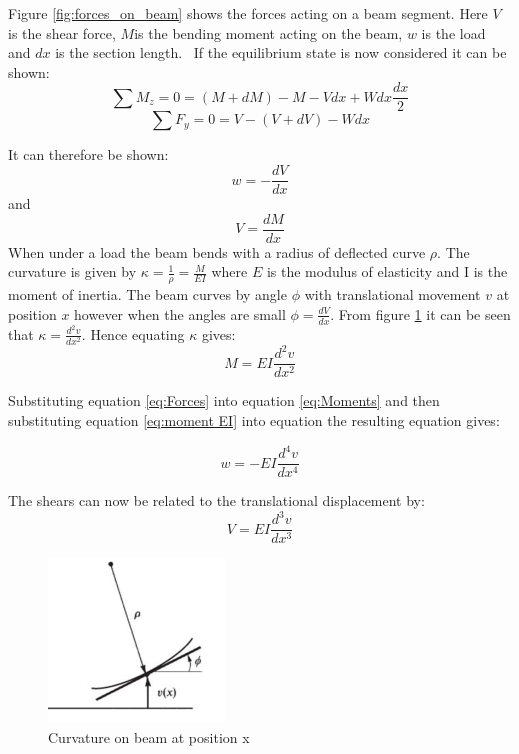 \documentclass[]{report}
\begin{document}
 Figure \ref{fig:forces_on_beam} shows the forces acting on a beam segment. Here $V$ is the shear force, $M$is the bending moment acting on the beam, $w$ is the load and $dx$ is the section length. 
\
If the equilibrium state is now considered it can be shown:
\begin{equation}
	\sum M_z = 0 = (M+dM) - M - Vdx + W dx \frac{dx}{2}
	\label{eq:equilibrium of moments}
\end{equation}
\begin{equation}
\sum F_y = 0 = V - (V+dV) - W dx
\label{eq:equilibrium of forces}
\end{equation}

It can therefore be shown:
\begin{equation}
w = -\frac{dV}{dx}
\label{eq:Moments}
\end{equation}
and 
\begin{equation}
V = \frac{dM}{dx}
\label{eq:Forces}
\end{equation}
When under a load the beam bends with a radius of deflected curve $\rho$. The curvature is given by $\kappa = \frac{1}{\rho} = \frac{M}{EI}$ where $E$ is the modulus of elasticity and I is the moment of inertia. The beam curves by angle $\phi$ with translational movement $v$ at position $x$ however when the angles are small $\phi = \frac{dV}{dx}$. From figure \ref{fig:curvature} it can be seen that $\kappa = \frac{d^2 v}{d x^2}$.
Hence equating $ \kappa$ gives:
\begin{equation}
M = EI  \frac{d^2 v}{d x^2}
\label{eq:moment EI}
\end{equation}

Substituting equation \ref{eq:Forces} into equation \ref{eq:Moments} and then substituting equation \ref{eq:moment EI} into equation the resulting equation gives:

\begin{equation}
w =- EI  \frac{d^4 v}{d x^4}
\label{eq:load_shear}
\end{equation}

The shears can now be related to the translational displacement by: 
\begin{equation}
V = EI  \frac{d^3 v}{d x^3}
\label{eq:shear_displacement}
\end{equation}


\begin{figure}
	\centering
	\includegraphics[scale=0.5]{curvature}
	\caption{Curvature on beam at position x}
	\label{fig:curvature}
\end{figure}
 
\end{document}
